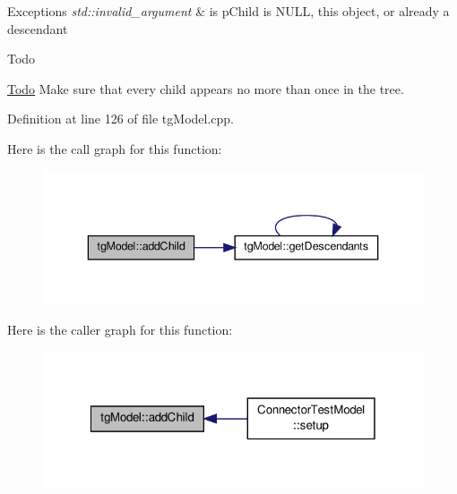\begin{DoxyExceptions}{Exceptions}
{\em std\-::invalid\-\_\-argument} & is p\-Child is N\-U\-L\-L, this object, or already a descendant \\
\hline
\end{DoxyExceptions}
\begin{DoxyRefDesc}{Todo}
\item[\hyperlink{todo__todo000016}{Todo}]Make sure that every child appears no more than once in the tree. \end{DoxyRefDesc}


Definition at line 126 of file tg\-Model.\-cpp.



Here is the call graph for this function\-:\nopagebreak
\begin{figure}[H]
\begin{center}
\leavevmode
\includegraphics[width=340pt]{classtg_model_a292c17848b96caee32b2286e44c13f2f_cgraph}
\end{center}
\end{figure}




Here is the caller graph for this function\-:\nopagebreak
\begin{figure}[H]
\begin{center}
\leavevmode
\includegraphics[width=320pt]{classtg_model_a292c17848b96caee32b2286e44c13f2f_icgraph}
\end{center}
\end{figure}


